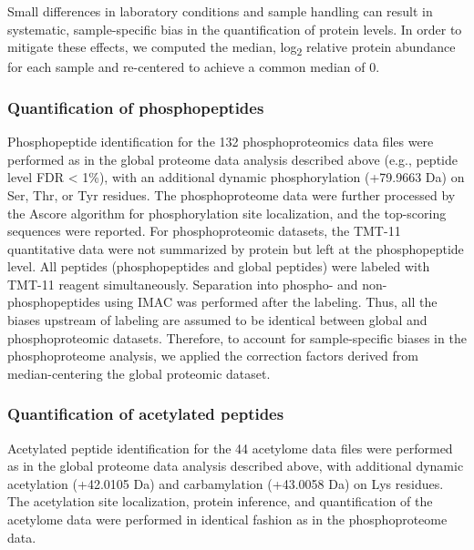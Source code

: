 Small differences in laboratory conditions and sample handling can result in systematic, sample-specific bias in the quantification of protein levels. In order to mitigate these effects, we computed the median, log\textsubscript{2} relative protein abundance for each sample and re-centered to achieve a common median of 0.

\subsubsection{Quantification of phosphopeptides}
Phosphopeptide identification for the 132 phosphoproteomics data files were performed as in the global proteome data analysis described above (e.g., peptide level FDR < 1\%), with an additional dynamic phosphorylation (+79.9663 Da) on Ser, Thr, or Tyr residues. The phosphoproteome data were further processed by the Ascore algorithm \cite{beausoleilsa_gygisp:ProbabilitybasedApproach2006} for phosphorylation site localization, and the top-scoring sequences were reported. For phosphoproteomic datasets, the TMT-11 quantitative data were not summarized by protein but left at the phosphopeptide level. All peptides (phosphopeptides and global peptides) were labeled with TMT-11 reagent simultaneously. Separation into phospho- and non-phosphopeptides using IMAC was performed after the labeling. Thus, all the biases upstream of labeling are assumed to be identical between global and phosphoproteomic datasets. Therefore, to account for sample-specific biases in the phosphoproteome analysis, we applied the correction factors derived from median-centering the global proteomic dataset.

\subsubsection{Quantification of acetylated peptides}
Acetylated peptide identification for the 44 acetylome data files were performed as in the global proteome data analysis described above, with additional dynamic acetylation (+42.0105 Da) and carbamylation (+43.0058 Da) on Lys residues. The acetylation site localization, protein inference, and quantification of the acetylome data were performed in identical fashion as in the phosphoproteome data.

